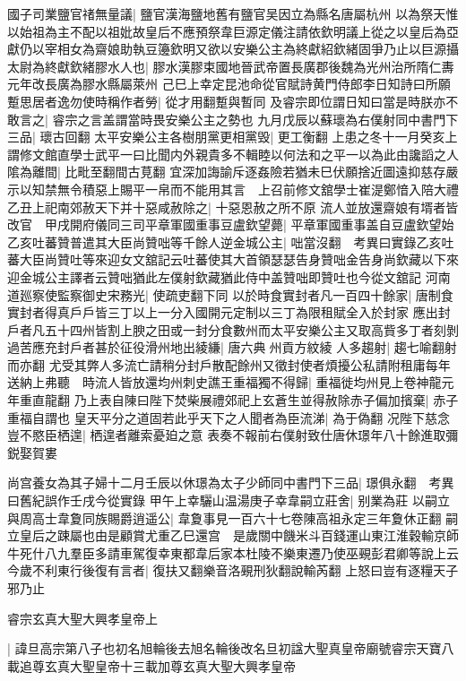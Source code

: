 國子司業鹽官禇無量議|{
	鹽官漢海鹽地舊有鹽官吴因立為縣名唐屬杭州}
以為祭天惟以始祖為主不配以祖妣故皇后不應預祭韋巨源定儀注請依欽明議上從之以皇后為亞獻仍以宰相女為齋娘助執豆籩欽明又欲以安樂公主為終獻紹欽緒固爭乃止以巨源攝太尉為終獻欽緒膠水人也|{
	膠水漢膠束國地晉武帝置長廣郡後魏為光州治所隋仁夀元年改長廣為膠水縣屬萊州}
己巳上幸定昆池命從官賦詩黄門侍郎李日知詩曰所願蹔思居者逸勿使時稱作者勞|{
	從才用翻蹔與暫同}
及睿宗即位謂日知曰當是時朕亦不敢言之|{
	睿宗之言盖謂當時畏安樂公主之勢也}
九月戊辰以蘇瓌為右僕射同中書門下三品|{
	瓌古回翻}
太平安樂公主各樹朋黨更相黨毁|{
	更工衡翻}
上患之冬十一月癸亥上謂修文館直學士武平一曰比聞内外親貴多不輯睦以何法和之平一以為此由讒謟之人隂為離間|{
	比毗至翻間古莧翻}
宜深加誨諭斥逐姦險若猶未巳伏願捨近圖遠抑慈存嚴示以知禁無令積惡上賜平一帛而不能用其言　上召前修文舘學士崔湜鄭愔入陪大禮乙丑上祀南郊赦天下并十惡咸赦除之|{
	十惡恩赦之所不原}
流人並放還齋娘有壻者皆改官　甲戌開府儀同三司平章軍國重事豆盧欽望薨|{
	平章軍國重事盖自豆盧欽望始}
乙亥吐蕃贊普遣其大臣尚贊咄等千餘人逆金城公主|{
	咄當沒翻　考異曰實錄乙亥吐蕃大臣尚贊吐等來迎女文舘記云吐蕃使其大首領瑟瑟告身贊咄金告身尚欽藏以下來迎金城公主譯者云贊咄猶此左僕射欽藏猶此侍中盖贊咄即贊吐也今從文舘記}
河南道廵察使監察御史宋務光|{
	使疏吏翻下同}
以於時食實封者凡一百四十餘家|{
	唐制食實封者得真戶戶皆三丁以上一分入國開元定制以三丁為限租賦全入於封家}
應出封戶者凡五十四州皆割上腴之田或一封分食數州而太平安樂公主又取高貲多丁者刻剝過苦應充封戶者甚於征役滑州地出綾縑|{
	唐六典州貢方紋綾}
人多趨射|{
	趨七喻翻射而亦翻}
尤受其弊人多流亡請稍分封戶散配餘州又徵封使者煩擾公私請附租庸每年送納上弗聽　時流人皆放還均州刺史譙王重福獨不得歸|{
	重福徙均州見上卷神龍元年重直龍翻}
乃上表自陳曰陛下焚柴展禮郊祀上玄蒼生並得赦除赤子偏加擯棄|{
	赤子重福自謂也}
皇天平分之道固若此乎天下之人聞者為臣流涕|{
	為于偽翻}
况陛下慈念豈不愍臣栖遑|{
	栖遑者離索憂廹之意}
表奏不報前右僕射致仕唐休璟年八十餘進取彌鋭娶賀婁

尚宫養女為其子婦十二月壬辰以休璟為太子少師同中書門下三品|{
	璟俱永翻　考異曰舊紀誤作壬戌今從實錄}
甲午上幸驪山温湯庚子幸韋嗣立莊舍|{
	别業為莊}
以嗣立與周高士韋夐同族賜爵逍遥公|{
	韋夐事見一百六十七卷陳高祖永定三年夐休正翻}
嗣立皇后之踈屬也由是顧賞尤重乙巳還宫　是歲關中饑米斗百錢運山東江淮穀輸京師牛死什八九羣臣多請車駕復幸東都韋后家本杜陵不樂東遷乃使巫覡彭君卿等說上云今歲不利東行後復有言者|{
	復扶又翻樂音洛覡刑狄翻說輸芮翻}
上怒曰豈有逐糧天子邪乃止

睿宗玄真大聖大興孝皇帝上

|{
	諱旦高宗第八子也初名旭輪後去旭名輪後改名旦初諡大聖真皇帝廟號睿宗天寶八載追尊玄真大聖皇帝十三載加尊玄真大聖大興孝皇帝}


